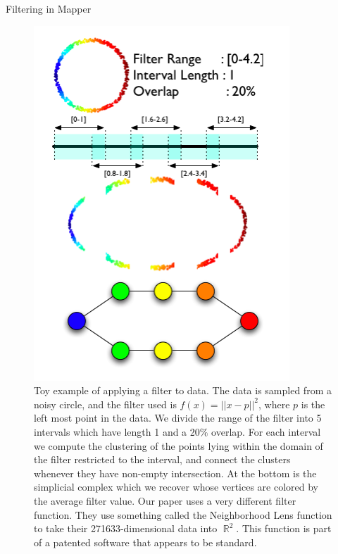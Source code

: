 \documentclass{beamer}
\DeclareMathOperator{\R}{\mathbb{R}}
\begin{document}
\begin{frame}{Filtering in Mapper}
    \begin{figure}
        \begin{columns}
            \begin{column}{0.3\textwidth}
                \includegraphics[width = \linewidth]{filter.png}
            \end{column}
            \begin{column}{0.65\textwidth}
                \caption{Toy example of applying a filter to data\cite{mapper}. The data is sampled from a noisy circle, and the filter used is $f(x) = ||x - p||^2$, where $p$ is the left most point in the data. We divide the range of the filter into 5 intervals which have length 1 and a 20$\%$ overlap. For each interval we compute the clustering of the points lying within the domain of the filter restricted to the interval, and connect the clusters whenever they have non-empty intersection. At the bottom is the simplicial complex which we recover whose vertices are colored by the average filter value. Our paper uses a very different filter function. They use something called the Neighborhood Lens function to take their 271633-dimensional data into $\R^2$. This function is part of a patented software that appears to be standard. }
            \end{column}
        \end{columns}
        
    \end{figure}
    
\end{frame}
\end{document}
